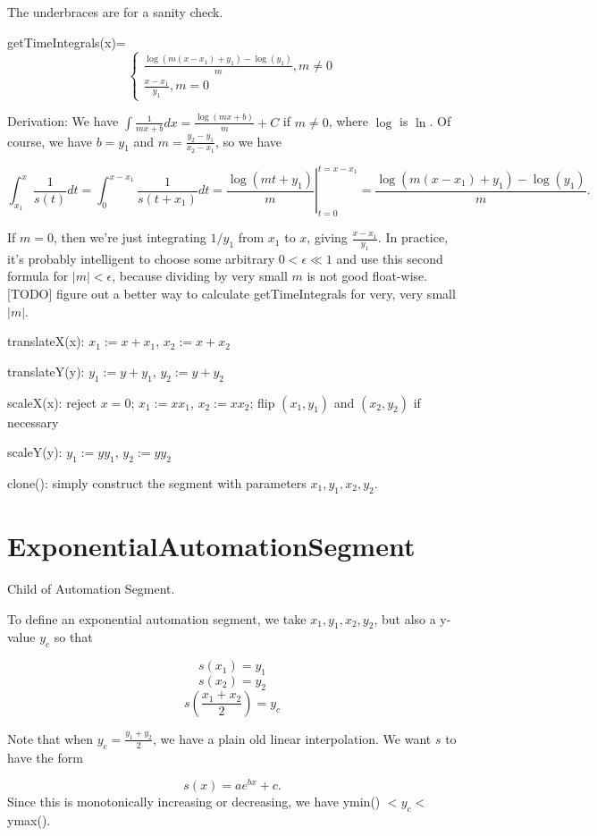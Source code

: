 \documentclass{article}
\begin{document}
{The underbraces are for a sanity check.

getTimeIntegrals(x)= $$\begin{cases}
\frac{\log(m(x-x_1)+y_1)-\log(y_1)}{m}, m\neq 0 \\
\frac{x-x_1}{y_1}, m = 0
\end{cases}$$

Derivation: We have $\int \frac{1}{mx+b} dx = \frac{\log(mx+b)}{m}+C$ if $m\neq 0$, where $\log$ is $\ln$. Of course, we have $b = y_1$ and $m=\frac{y_2 - y_1}{x_2 - x_1}$, so we have

$$\int_{x_1}^x \frac{1}{s(t)} dt = \int_{0}^{x-x_1} \frac{1}{s(t+x_1)} dt = \left. \frac{\log(mt+y_1)}{m} \right\vert _ {t=0}^{t=x-x_1} = \frac{\log(m(x-x_1)+y_1)-\log(y_1)}{m}.$$

If $m=0$, then we're just integrating $1/y_1$ from $x_1$ to $x$, giving $\frac{x-x_1}{y_1}$. In practice, it's probably intelligent to choose some arbitrary $0<\epsilon\ll 1$ and use this second formula for $|m| < \epsilon$, because dividing by very small $m$ is not good float-wise. [TODO] figure out a better way to calculate getTimeIntegrals for very, very small $|m|$.

translateX(x): $x_1:=x+x_1$, $x_2:=x+x_2$

translateY(y): $y_1:=y+y_1$, $y_2:=y+y_2$

scaleX(x): reject $x=0$; $x_1:=xx_1$, $x_2:=xx_2$; flip $(x_1, y_1)$ and $(x_2, y_2)$ if necessary

scaleY(y): $y_1:=yy_1$, $y_2:=yy_2$

clone(): simply construct the segment with parameters $x_1, y_1, x_2, y_2$.

\section{ExponentialAutomationSegment}

Child of Automation Segment.

To define an exponential automation segment, we take $x_1, y_1, x_2, y_2$, but also a y-value $y_c$ so that

$$s(x_1)=y_1$$
$$s(x_2)=y_2$$
$$s\left(\frac{x_1+x_2}{2}\right) = y_c$$

Note that when $y_c = \frac{y_1+y_2}{2}$, we have a plain old linear interpolation. We want $s$ to have the form

$$s(x) = ae^{bx}+c.$$ Since this is monotonically increasing or decreasing, we have ymin() $< y_c <$ ymax().

}
\end{document}
